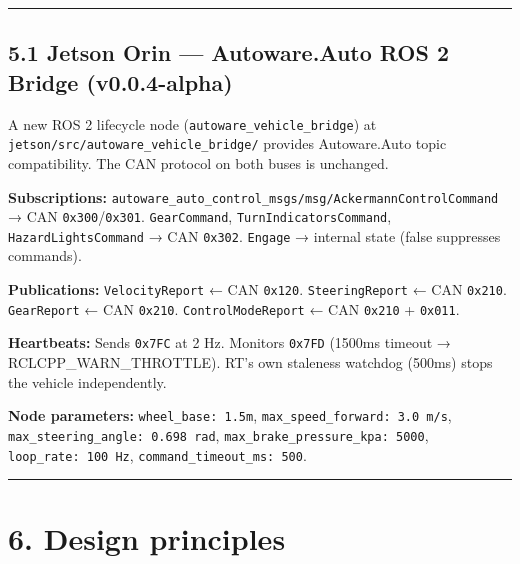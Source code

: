 \begin{center}\rule{0.5\linewidth}{0.5pt}\end{center}

\subsection{5.1 Jetson Orin --- Autoware.Auto ROS 2 Bridge
(v0.0.4-alpha)}\label{jetson-orin-autoware.auto-ros-2-bridge-v0.0.4-alpha}

A new ROS 2 lifecycle node (\texttt{autoware\_vehicle\_bridge}) at
\texttt{jetson/src/autoware\_vehicle\_bridge/} provides Autoware.Auto topic
compatibility. The CAN protocol on both buses is unchanged.

\textbf{Subscriptions:}
\texttt{autoware\_auto\_control\_msgs/msg/AckermannControlCommand} → CAN
\texttt{0x300}/\texttt{0x301}. \texttt{GearCommand},
\texttt{TurnIndicatorsCommand}, \texttt{HazardLightsCommand} → CAN
\texttt{0x302}. \texttt{Engage} → internal state (false suppresses commands).

\textbf{Publications:} \texttt{VelocityReport} ← CAN \texttt{0x120}.
\texttt{SteeringReport} ← CAN \texttt{0x210}. \texttt{GearReport} ← CAN
\texttt{0x210}. \texttt{ControlModeReport} ← CAN \texttt{0x210} +
\texttt{0x011}.

\textbf{Heartbeats:} Sends \texttt{0x7FC} at 2 Hz. Monitors \texttt{0x7FD}
(1500ms timeout → RCLCPP\_WARN\_THROTTLE). RT's own staleness watchdog (500ms)
stops the vehicle independently.

\textbf{Node parameters:} \texttt{wheel\_base:\ 1.5m},
\texttt{max\_speed\_forward:\ 3.0\ m/s},
\texttt{max\_steering\_angle:\ 0.698\ rad},
\texttt{max\_brake\_pressure\_kpa:\ 5000}, \texttt{loop\_rate:\ 100\ Hz},
\texttt{command\_timeout\_ms:\ 500}.

\begin{center}\rule{0.5\linewidth}{0.5pt}\end{center}

\section{6. Design principles}\label{design-principles}

